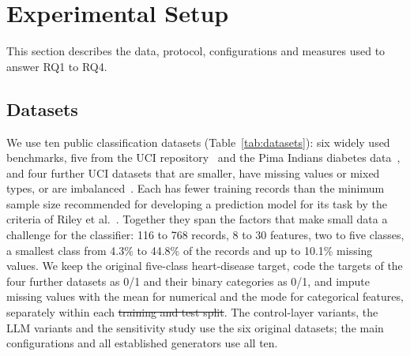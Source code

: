 \documentclass[conference]{IEEEtran}
\providecommand{\DIFaddtex}[1]{{\protect\color{blue}\uwave{#1}}} %
\providecommand{\DIFdeltex}[1]{{\protect\color{red}\sout{#1}}}                      %
\providecommand{\DIFaddbegin}{} %
\providecommand{\DIFaddend}{} %
\providecommand{\DIFdelbegin}{} %
\providecommand{\DIFdelend}{} %
\providecommand{\DIFadd}[1]{\texorpdfstring{\DIFaddtex{#1}}{#1}} %
\providecommand{\DIFdel}[1]{\texorpdfstring{\DIFdeltex{#1}}{}} %
\newcommand{\DIFscaledelfig}{0.5}
\newlength{\DIFdelgraphicswidth} %
\newlength{\DIFdelgraphicsheight} %
\newcommand{\DIFaddincludegraphics}[2][]{{\color{blue}\fbox{\DIFOincludegraphics[#1]{#2}}}} %
\newcommand{\DIFdelincludegraphics}[2][]{%
\sbox{\DIFdelgraphicsbox}{\DIFOincludegraphics[#1]{#2}}%
\settoboxwidth{\DIFdelgraphicswidth}{\DIFdelgraphicsbox} %
\settoboxtotalheight{\DIFdelgraphicsheight}{\DIFdelgraphicsbox} %
\scalebox{\DIFscaledelfig}{%
\parbox[b]{\DIFdelgraphicswidth}{\usebox{\DIFdelgraphicsbox}\\[-\baselineskip] \rule{\DIFdelgraphicswidth}{0em}}\llap{\resizebox{\DIFdelgraphicswidth}{\DIFdelgraphicsheight}{%
\setlength{\unitlength}{\DIFdelgraphicswidth}%
\begin{picture}(1,1)%
\thicklines\linethickness{2pt} %
{\color[rgb]{1,0,0}\put(0,0){\framebox(1,1){}}}%
{\color[rgb]{1,0,0}\put(0,0){\line( 1,1){1}}}%
{\color[rgb]{1,0,0}\put(0,1){\line(1,-1){1}}}%
\end{picture}%
}\hspace*{3pt}}} %
} %
\DeclareRobustCommand{\DIFaddbegin}{\DIFOaddbegin \let\includegraphics\DIFaddincludegraphics} %
\DeclareRobustCommand{\DIFaddend}{\DIFOaddend \let\includegraphics\DIFOincludegraphics} %
\DeclareRobustCommand{\DIFdelbegin}{\DIFOdelbegin \let\includegraphics\DIFdelincludegraphics} %
\DeclareRobustCommand{\DIFdelend}{\DIFOaddend \let\includegraphics\DIFOincludegraphics} %
\begin{document}
\section{Experimental Setup}
\label{sec:setup}
This section describes the data, protocol, configurations and measures used to answer RQ1 to RQ4.

\subsection{Datasets}
We use ten public classification datasets (Table~\ref{tab:datasets}): six widely used benchmarks, five from the UCI repository~\cite{uciheart,ucibreast,uciheartfailure,uciilpd,uciparkinsons} and the Pima Indians diabetes data~\cite{smith1988diabetes}, and four further UCI datasets that are smaller, have missing values or mixed types, or are imbalanced~\cite{patricio2018coimbra,ucihepatitis,ucickd,zieba2014thoracic}. Each has fewer training records than the minimum sample size recommended for developing a prediction model for its task by the criteria of Riley et al.~\cite{riley2019binary}. Together they span the factors that make small data a challenge for the classifier: 116 to 768 records, 8 to 30 features, two to five classes, a smallest class from 4.3\% to 44.8\% of the records and up to 10.1\% missing values. We keep the original five-class heart-disease target, code the targets of the four further datasets as 0/1 and their binary categories as 0/1, and impute missing values with the mean for numerical and the mode for categorical features, separately within each \DIFdelbegin \DIFdel{training and test split}\DIFdelend \DIFaddbegin \DIFadd{division}\DIFaddend . The control-layer variants, the \DIFaddbegin \DIFadd{other }\DIFaddend LLM variants and the sensitivity study use the six original datasets; the main configurations and all established generators use all ten.
\end{document}
